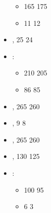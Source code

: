 \begin{itemize}
\begin{itemize}
\item \basecost{} 165 \costup{} 175
\item \extramodel{} 11 \costup{} 12
\end{itemize}
\item \knightsforlorn{}, \extramodel{} 25 \costdown{} 24
\item \knightsofthegrail{}\spacebeforecolon{}:
\begin{itemize}
\item \basecost{} 210 \costdown{} 205
\item \extramodel{} 86 \costdown{} 85
\end{itemize}
\item \knightsofthequest{}, \basecost{} 265 \costdown{} 260
\item \peasantcrusaders{}, \extramodel{} 9 \costdown{} 8
\item \trebuchet{}, \basecost{} 265 \costdown{} 260
\item \yeomanoutriders{}, \basecost{} 130 \costdown{} 125
\item \pegasusknights{}\spacebeforecolon{}:
\begin{itemize}
\item \extramodel{} 100 \costdown{} 95
\item \looseformation{} 6 \costdown{} 3
\end{itemize}
\end{itemize}
